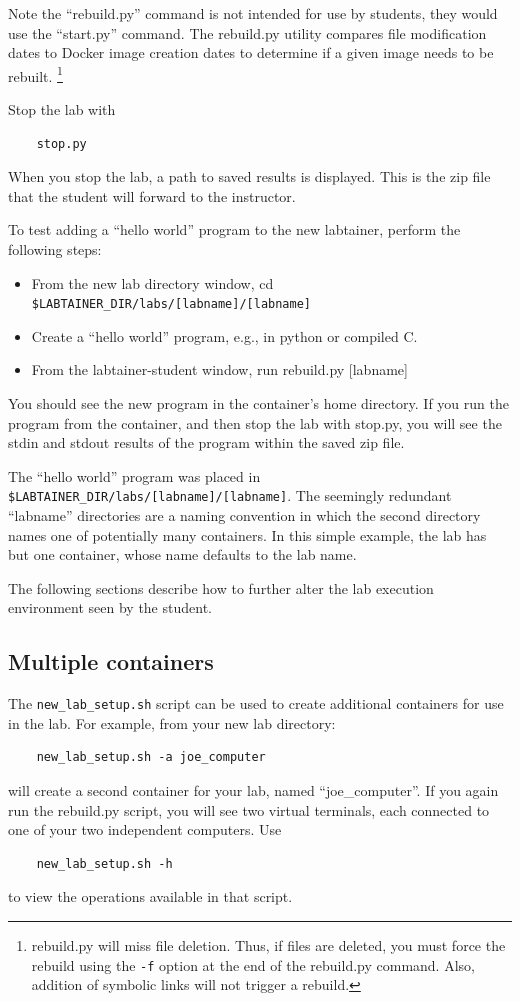 \documentclass[12pt]{article}
\begin{document}
Note the ``rebuild.py'' command is not intended for use by students, they would use the ``start.py'' command.  
The rebuild.py utility compares file modification dates to Docker image creation dates to determine if
a given image needs to be rebuilt.  \footnote{rebuild.py will miss file deletion.  Thus, if files are deleted, you must
force the rebuild using the {\tt -f} option at the end of the rebuild.py command. Also, addition of symbolic links will not
trigger a rebuild.}

Stop the lab with 
\begin{verbatim}
    stop.py 
\end{verbatim}
When you stop the lab, a path to saved results is displayed.
This is the zip file that the student will forward to the instructor.

To test adding a ``hello world'' program to the new labtainer, perform the following steps:
\begin{itemize}
\item From the new lab directory window, cd \verb!$LABTAINER_DIR/labs/[labname]/[labname]!
\item Create a ``hello world'' program, e.g., in python or compiled C.
\item From the labtainer-student window, run rebuild.py [labname]
\end{itemize}
    
You should see the new program in the container's
home directory.  If you run the program from the container, and then stop the lab
with stop.py, you will see the stdin and stdout results of the program within the
saved zip file.

The ``hello world'' program was placed in \verb!$LABTAINER_DIR/labs/[labname]/[labname]!.
The seemingly redundant ``labname'' directories are a naming convention in which the
second directory names one of potentially many containers.  In this simple example,
the lab has but one container, whose name defaults to the lab name.

The following sections describe how to further alter the lab execution environment seen by 
the student.

\subsection {Multiple containers}
The {\tt new\_lab\_setup.sh} script can be used to create additional containers for use
in the lab.  For example, from your new lab directory:
\begin{verbatim}
    new_lab_setup.sh -a joe_computer
\end{verbatim}
\noindent will create a second container for your lab,
named ``joe\_computer''.  If you again run the rebuild.py script, you will see two virtual
terminals, each connected to one of your two independent computers.  Use 
\begin{verbatim}
    new_lab_setup.sh -h
\end{verbatim}
\noindent to view the operations available in that script.
\end{document}
